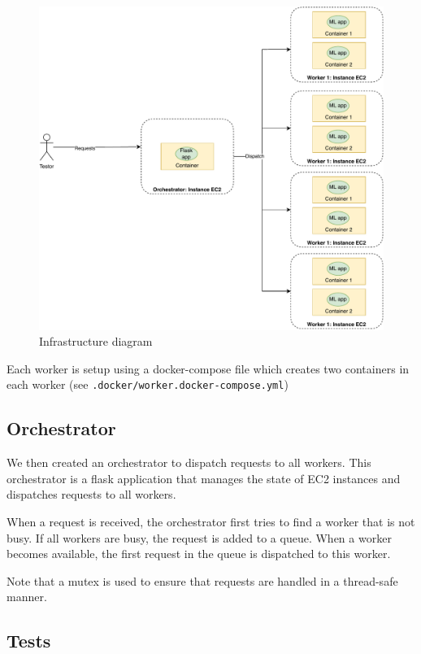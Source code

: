 \documentclass[letterpaper,headings=standardclasses,parskip=half]{scrartcl}
\begin{document}
\begin{figure}[H]
    \centering
    \includegraphics[width=\textwidth]{images/infra.pdf}
    \caption{Infrastructure diagram}
    \label{fig:infra}
\end{figure}

Each worker is setup using a docker-compose file which creates two containers in each worker (see \texttt{.docker/worker.docker-compose.yml})

\subsection{Orchestrator}

We then created an orchestrator to dispatch requests to all workers. This orchestrator is a flask application that manages the state of EC2 instances and dispatches requests to all workers.

When a request is received, the orchestrator first tries to find a worker that is not busy. If all workers are busy, the request is added to a queue. When a worker becomes available, the first request in the queue is dispatched to this worker.

Note that a mutex is used to ensure that requests are handled in a thread-safe manner.

\subsection{Tests}
\end{document}
